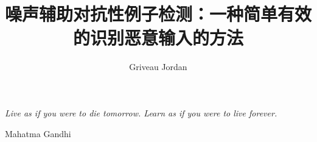 \documentclass{hnuthesis}
\title{噪声辅助对抗性例子检测：一种简单有效的识别恶意输入的方法}
\author{Griveau Jordan}
\newcommand\blankpage{%
    \null
    \thispagestyle{empty}%
    \addtocounter{page}{-1}%
    \newpage}
\begin{document}
\maketitle


\vspace*{0.2\textheight}

{\itshape Live as if you were to die tomorrow. Learn as if you
    were to live forever.}\bigbreak

\hfill Mahatma Gandhi
\afterpage{\blankpage}


\tableofcontents
\listoffigures
\listoftables

\mainmatter














\backmatter

\end{document}
